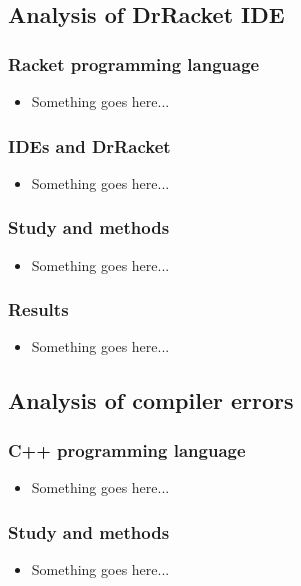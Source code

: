 \documentclass{beamer}
\begin{document}
\subsection[DrRacket Analysis]{Analysis of DrRacket IDE}

\begin{frame}
	\frametitle{Racket programming language}
		\begin{itemize}
			\item Something goes here...
		\end{itemize}

\end{frame}

\begin{frame}
	\frametitle{IDEs and DrRacket}
		\begin{itemize}
			\item Something goes here...
		\end{itemize}

\end{frame}

\begin{frame}
	\frametitle{Study and methods}
		\begin{itemize}
			\item Something goes here...
		\end{itemize}

\end{frame}

\begin{frame}
	\frametitle{Results}
		\begin{itemize}
			\item Something goes here...
		\end{itemize}

\end{frame}

\subsection[Compiler Analysis]{Analysis of compiler errors}

\begin{frame}
	\frametitle{C++ programming language}
		\begin{itemize}
			\item Something goes here...
		\end{itemize}

\end{frame}

\begin{frame}
	\frametitle{Study and methods}
		\begin{itemize}
			\item Something goes here...
		\end{itemize}

\end{frame}
\end{document}
